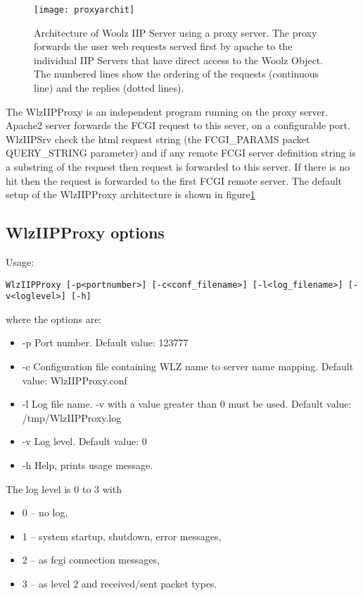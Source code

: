 \documentclass[11pt]{article}
\begin{document}
\begin{figure}[!htb]
\texttt{[image: proxyarchit]}
\caption{Architecture of Woolz IIP Server using a proxy server.
The proxy forwards the user web requests served first by apache
to the individual IIP Servers that have direct access to the Woolz
Object. The numbered lines show the ordering of the requests (continuous
line) and the replies (dotted lines).}
\label{fig:proxyarchit}
\end{figure}


The WlzIIPProxy is an independent program running on the proxy
server. Apache2 server forwards the FCGI request to this sever,
on a configurable port. WlzIIPSrv check the html request string
(the FCGI\_PARAMS packet QUERY\_STRING parameter) and if any
remote FCGI server definition string is a substring of the
request then request is forwarded to this server. If there is no
hit then the request is forwarded to the first FCGI remote server.
The default setup of the WlzIIPProxy architecture is shown in
figure\ref{fig:proxyarchit}


\subsection{WlzIIPProxy options}
Usage:
\begin{verbatim}
WlzIIPProxy [-p<portnumber>] [-c<conf_filename>] [-l<log_filename>] [-v<loglevel>] [-h]
\end{verbatim}

where the options are:
\begin{itemize}
\item -p  Port number. Default value: 123777
\item -c  Configuration file containing WLZ name to server name mapping.
          Default value: \mbox{WlzIIPProxy.conf}
\item -l  Log file name. -v with a value greater than 0 must be used.
          Default value: \mbox{/tmp/WlzIIPProxy.log}
\item -v  Log level. Default value: 0
\item -h  Help, prints usage message.
\end{itemize}

The log level is 0 to 3 with
\begin{itemize}
\item 0 -- no log,
\item 1 -- system startup, shutdown, error messages,
\item 2 -- as fcgi connection messages,
\item 3 -- as level 2 and received/sent packet types.
\end{itemize}
\end{document}
